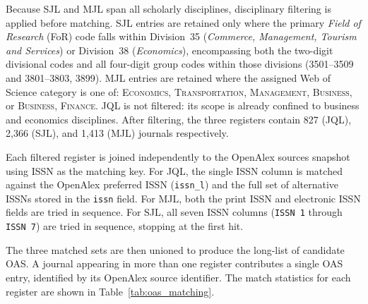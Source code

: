 \documentclass[10pt]{article}
\begin{document}
Because SJL and MJL span all scholarly disciplines, disciplinary filtering is applied before matching.
SJL entries are retained only where the primary \textit{Field of Research} (FoR) code falls within
Division~35 (\textit{Commerce, Management, Tourism and Services}) or Division~38 (\textit{Economics}),
encompassing both the two-digit divisional codes and all four-digit group codes within those divisions
(3501--3509 and 3801--3803, 3899).
MJL entries are retained where the assigned Web of Science category is one of:
\textsc{Economics}, \textsc{Transportation}, \textsc{Management}, \textsc{Business},
or \textsc{Business, Finance}.
JQL is not filtered: its scope is already confined to business and economics disciplines.
After filtering, the three registers contain 827 (JQL), 2{,}366 (SJL), and 1{,}413 (MJL) journals respectively.

Each filtered register is joined independently to the OpenAlex sources snapshot
using ISSN as the matching key.
For JQL, the single ISSN column is matched against the OpenAlex preferred ISSN
(\texttt{issn\_l}) and the full set of alternative ISSNs stored in the \texttt{issn} field.
For MJL, both the print ISSN and electronic ISSN fields are tried in sequence.
For SJL, all seven ISSN columns ({\small\texttt{ISSN~1}} through {\small\texttt{ISSN~7}}) are tried in sequence,
stopping at the first hit.

The three matched sets are then unioned to produce the long-list of candidate OAS.
A journal appearing in more than one register contributes a single OAS entry,
identified by its OpenAlex source identifier.
The match statistics for each register are shown in Table~\ref{tab:oas_matching}.
\end{document}
